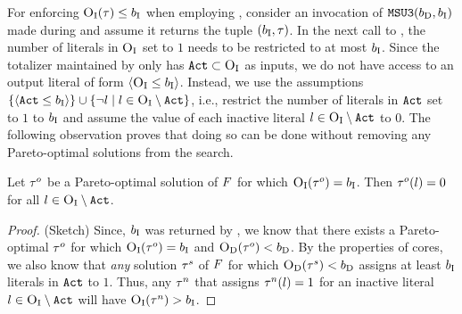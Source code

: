 For enforcing $\textsc{O}_{\text{I}}(\tau)\le b_{\text{I}}$ when employing \msu{}, consider an invocation of $\texttt{MSU3}(b_{\text{D}}, b_{\text{I}})$ made during \algname{} and assume it returns the tuple $(b_{\text{I}}, \tau)$. 
In the next call to \Simpr{}, the number of literals in $\textsc{O}_{\text{I}}$ set to $1$ needs to be restricted to at most $b_{\text{I}}$. 
Since the totalizer maintained by \msu{} only has $\texttt{Act} \subset \textsc{O}_{\text{I}}$ as inputs, we do not have access to an output literal of form  $\langle \textsc{O}_{\text{I}} \leq b_{\text{I}} \rangle$.
Instead, we use  the assumptions $\{ \langle \texttt{Act} \leq b_{\text{I}} \rangle\} \cup \{ \lnot l \mid l \in \textsc{O}_{\text{I}} \setminus \texttt{Act} \}$, i.e., restrict the number of literals in $\texttt{Act}$ set to $1$ to $b_{\text{I}}$ and assume the value of each inactive literal $l \in \textsc{O}_{\text{I}} \setminus \texttt{Act}$ to $0$. 
The following observation proves that doing so can be done without removing any Pareto-optimal solutions from the search. 
\begin{observation}\label{obs:sound}
  Let $\tau^o$ be a Pareto-optimal solution of $F$ for which $\textsc{O}_{\text{I}}(\tau^o) = b_{\text{I}}$.
  Then $\tau^o(l) = 0$ for all $l \in \textsc{O}_{\text{I}} \setminus \texttt{Act}$. 
\end{observation}
\begin{proof}(Sketch)
  Since, $b_{\text{I}}$ was returned by \msu{}, we know that there exists a Pareto-optimal $\tau^o$ for which $\textsc{O}_{\text{I}}(\tau^o) = b_{\text{I}}$ and $\textsc{O}_{\text{D}}(\tau^o) < b_{\text{D}}$.
  By the properties of cores, we also know that \emph{any} solution $\tau^s$ of $F$ for which $\textsc{O}_{\text{D}}(\tau^s) < b_{\text{D}}$ assigns at least $b_{\text{I}}$ literals in $\texttt{Act}$ to $1$.
  Thus, any $\tau^n$ that assigns $\tau^n(l) = 1$ for an inactive literal $l \in \textsc{O}_{\text{I}} \setminus \texttt{Act}$ will have $\textsc{O}_{\text{I}}(\tau^n) > b_{\text{I}}$.
\end{proof}

